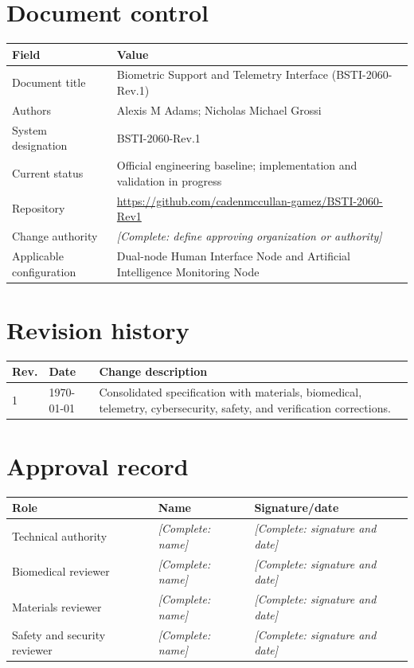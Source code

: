 \documentclass[11pt,a4paper]{article}
\newcommand{\placeholder}[1]{\textit{[Complete: #1]}}
\begin{document}
\section*{Document control}
\begin{longtable}{p{}p{}}
\toprule
\textbf{Field} & \textbf{Value}\\
\midrule
Document title & Biometric Support and Telemetry Interface (BSTI-2060-Rev.1)\\
Authors & Alexis M Adams; Nicholas Michael Grossi\\
System designation & BSTI-2060-Rev.1\\
Current status & Official engineering baseline; implementation and validation in progress\\
Repository & \url{https://github.com/cadenmccullan-gamez/BSTI-2060-Rev1}\\
Change authority & \placeholder{define approving organization or authority}\\
Applicable configuration & Dual-node Human Interface Node and Artificial Intelligence Monitoring Node\\
\bottomrule
\end{longtable}

\section*{Revision history}
\begin{longtable}{p{}p{}p{}}
\toprule
\textbf{Rev.} & \textbf{Date} & \textbf{Change description}\\
\midrule
1 & \today & Consolidated specification with materials, biomedical, telemetry, cybersecurity, safety, and verification corrections.\\
\bottomrule
\end{longtable}

\section*{Approval record}
\begin{longtable}{p{}p{}p{}}
\toprule
\textbf{Role} & \textbf{Name} & \textbf{Signature/date}\\
\midrule
Technical authority & \placeholder{name} & \placeholder{signature and date}\\
Biomedical reviewer & \placeholder{name} & \placeholder{signature and date}\\
Materials reviewer & \placeholder{name} & \placeholder{signature and date}\\
Safety and security reviewer & \placeholder{name} & \placeholder{signature and date}\\
\bottomrule
\end{longtable}
\end{document}
